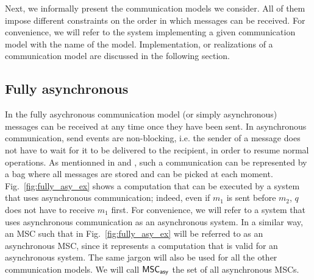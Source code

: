 
Next, we informally present the communication models we consider. All of them impose different constraints on the order in which messages can be received.
For convenience, we will refer to the system implementing a given communication model with the name of the model. Implementation, or realizations of a communication model are discussed in the following section.

%
\subsection{Fully asynchronous}
In the fully asychronous communication model (or simply asynchronous) messages can be received at any time once they have been sent. In asynchronous communication, send events are non-blocking, i.e. the sender of a message does not have to wait for it to be delivered to the recipient, in order to resume normal operations.
As mentionned in \cite{DBLP:journals/fac/ChevrouHQ16} and \cite{DBLP:journals/tcs/BasuB16}, such a communication can be represented by a bag where all messages are stored and can be picked at each moment.
Fig.~\ref{fig:fully_asy_ex} shows a computation that can be executed by a system that uses asynchronous communication; indeed, even if $m_1$ is sent before $m_2$, $q$ does not have to receive $m_1$ first.  For convenience, we will refer to a system that uses asynchronous communication as an asynchronous system. In a similar way, an MSC such that in Fig.~\ref{fig:fully_asy_ex} will be referred to as an asynchronous MSC, since it represents a computation that is valid for an asynchronous system. The same jargon will also be used for all the other communication models. We will call $\mathsf{MSC}_{\mathsf{asy}}$ the set of all asynchronous MSCs.


